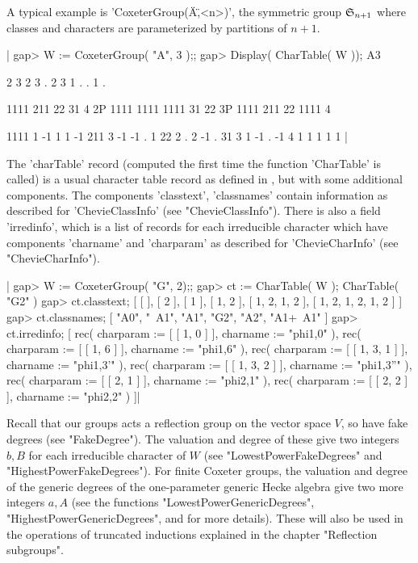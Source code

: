 A   typical  example  is  'CoxeterGroup(\"A\",<n>)',  the  symmetric  group
${\mathfrak S}_{n+1}$  where classes and characters  are parameterized by partitions
of $n+1$.

|    gap> W := CoxeterGroup( "A", 3 );;
    gap> Display( CharTable( W ));
    A3

          2    3    2    3    .  2
          3    1    .    .    1  .

            1111  211   22   31  4
         2P 1111 1111 1111   31 22
         3P 1111  211   22 1111  4

    1111       1   -1    1    1 -1
    211        3   -1   -1    .  1
    22         2    .    2   -1  .
    31         3    1   -1    . -1
    4          1    1    1    1  1
    |

The 'charTable' record (computed the first time the function 'CharTable' is
called) is a usual character table record as defined in \GAP, but with some
additional  components.  The  components  'classtext', 'classnames' contain
information  as  described  for  'ChevieClassInfo' (see "ChevieClassInfo").
There  is also  a field  'irredinfo', which  is a  list of records for each
irreducible  character which have components  'charname' and 'charparam' as
described for 'ChevieCharInfo' (see "ChevieCharInfo").

|    gap> W := CoxeterGroup( "G", 2);;
    gap> ct := CharTable( W );
    CharTable( "G2" )
    gap> ct.classtext;
    [ [  ], [ 2 ], [ 1 ], [ 1, 2 ], [ 1, 2, 1, 2 ], [ 1, 2, 1, 2, 1, 2 ] ]
    gap> ct.classnames;
    [ "A0", "~A1", "A1", "G2", "A2", "A1+~A1" ]
    gap> ct.irredinfo;
    [ rec(
          charparam := [ [ 1, 0 ] ],
          charname := "phi{1,0}" ), rec(
          charparam := [ [ 1, 6 ] ],
          charname := "phi{1,6}" ), rec(
          charparam := [ [ 1, 3, 1 ] ],
          charname := "phi{1,3}'" ), rec(
          charparam := [ [ 1, 3, 2 ] ],
          charname := "phi{1,3}''" ), rec(
          charparam := [ [ 2, 1 ] ],
          charname := "phi{2,1}" ), rec(
          charparam := [ [ 2, 2 ] ],
          charname := "phi{2,2}" ) ]|

Recall  that our groups acts a reflection group on the vector space $V$, so
have  fake degrees  (see "FakeDegree").  The valuation  and degree of these
give  two  integers  $b,B$  for  each  irreducible  character  of  $W$ (see
"LowestPowerFakeDegrees" and "HighestPowerFakeDegrees"). For finite Coxeter
groups,   the  valuation  and   degree  of  the   generic  degrees  of  the
one-parameter  generic Hecke algebra give two  more integers $a,A$ (see the
functions  "LowestPowerGenericDegrees",  "HighestPowerGenericDegrees",  and
\cite[Ch.11]  {Car85} for  more details).  These will  also be  used in the
operations  of truncated  inductions explained  in the  chapter "Reflection
subgroups".

